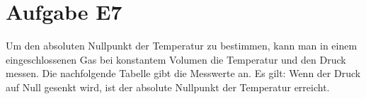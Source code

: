 \section{Aufgabe E7}
Um den absoluten Nullpunkt der Temperatur zu bestimmen, kann man in einem eingeschlossenen Gas bei
konstantem Volumen die Temperatur und den Druck messen. Die nachfolgende Tabelle gibt die Messwerte
an.
Es gilt: Wenn der Druck auf Null gesenkt wird, ist der absolute Nullpunkt der Temperatur erreicht.